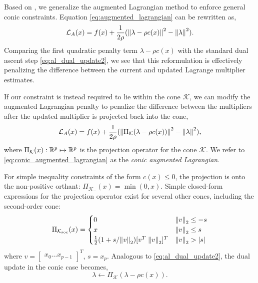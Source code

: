 \documentclass[../root.tex]{subfiles}
\begin{document}
    Based on \cite{liu_Convergence_2008}, we generalize the augmented
    Lagrangian method to enforce general conic constraints. Equation
    \eqref{eq:augmented_lagrangian} can be rewritten as,
    \begin{equation}
        \mathcal{L}_A(x) = f(x) + \frac{1}{2 \rho} (\norm{\lambda - \rho c(x)}^2 - \norm{\lambda}^2).
    \end{equation}
    Comparing the first quadratic penalty term $\lambda - \rho c(x)$ with the
    standard dual ascent step \eqref{eq:al_dual_update2}, we see that this
    reformulation is effectively penalizing the difference between the
    current and updated Lagrange multiplier estimates.
    
    If our constraint is instead required to lie within the cone
    $\mathcal{K}$, we can modify the augmented Lagrangian penalty to penalize
    the difference between the multipliers after the updated multiplier is
    projected back into the cone,
    \begin{equation} \label{eq:conic_augmented_lagrangian}
        \mathcal{L}_A(x) = f(x) + \frac{1}{2 \rho} (\norm{\Pi_\mathcal{K}(\lambda - \rho c(x))}^2 - \norm{\lambda}^2),
    \end{equation}
    where $\Pi_\mathcal{K}(x) : \mathbb{R}^{p} \mapsto \mathbb{R}^{p}$ is the projection operator
    for the cone $\mathcal{K}$. We refer to
    \eqref{eq:conic_augmented_lagrangian} as the \textit{conic augmented
    Lagrangian}.
    
    For simple inequality constraints of the form $c(x) \leq 0$, the
    projection is onto the non-positive orthant: $\Pi_{\mathcal{K}_-}(x) =
    \min(0,x)$. Simple closed-form expressions for the projection operator
    exist for several other cones, including the second-order cone:
    \begin{equation} \label{eq:soc_projection}
        \Pi_{\mathcal{K}_\text{soc}}(x) = \begin{cases}
            0 & \norm{v}_2 \leq -s \\
            x & \norm{v}_2 \leq s  \\
            \frac{1}{2} (1 + s/\norm{v}_2) [v^T \; \norm{v}_2]^T & \norm{v}_2 > \abs{s}
        \end{cases}
    \end{equation}
    where $v = \begin{bmatrix} x_0 \dots x_{p-1} \end{bmatrix}^T$, $s = x_p$.
    Analogous to \eqref{eq:al_dual_update2}, the dual update in the conic case
    becomes,
    \begin{equation}
        \lambda \gets \Pi_\mathcal{K}(\lambda - \rho c(x)) .
    \end{equation}
    
\end{document}
